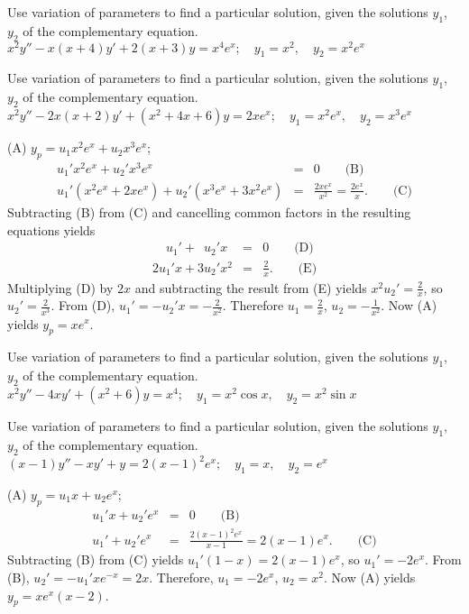 \documentclass{ximera}
\begin{document}
\begin{problem}\label{exer:5.7.25}
Use variation
of parameters to find a particular solution, given the solutions
$y_1$, $y_2$ of the complementary equation. $x^2y''-x(x+4)y'+2(x+3)y=x^4e^x;  \quad y_1=x^2, \quad y_2=x^2e^x$
\end{problem}

\begin{problem}\label{exer:5.7.26}
Use variation
of parameters to find a particular solution, given the solutions
$y_1$, $y_2$ of the complementary equation. $x^2y''-2x(x+2)y'+(x^2+4x+6)y=2xe^x;  \quad y_1=x^2e^x, \quad y_2=x^3e^x$

\begin{solution}
    (A) $y_p=u_1x^2e^x+u_2x^3e^x$;\;
\begin{eqnarray*}
u_1'x^2e^x+u_2'x^3e^x&=&0\qquad\text{(B)}\\ %
u_1'(x^2e^x+2xe^x)+u_2'(x^3e^x+3x^2e^x)&=&\frac{2xe^x}{
x^2}=\frac{2e^x}{ x}.\qquad\text{(C)} %
\end{eqnarray*}
Subtracting (B) from (C)
and cancelling common factors in the resulting equations
yields
\begin{eqnarray*}
\phantom{2x}u_1'+\phantom{3}u_2'x&=&0\qquad\text{(D)}\\ %
2u_1'x+3u_2'x^2&=&\frac{2}{ x}.\qquad\text{(E)} %
\end{eqnarray*}
Multiplying (D) by $2x$ and subtracting the result
from (E) yields $x^2u_2'=\frac{2}{ x}$, so
$u_2'=\frac{2}{ x^3}$. From (D),
$u_1'=-u_2'x=-\frac{2}{ x^2}$. Therefore $u_1=\frac{2}{ x}$,
$u_2=-\frac{1}{ x^2}$. Now (A) yields $y_p=xe^x$.
\end{solution}
\end{problem}

\begin{problem}\label{exer:5.7.27}
Use variation
of parameters to find a particular solution, given the solutions
$y_1$, $y_2$ of the complementary equation. $x^2y''-4xy'+(x^2+6)y=x^4;  \quad y_1=x^2\cos x, \quad y_2=x^2\sin x$
\end{problem}

\begin{problem}\label{exer:5.7.28}
Use variation
of parameters to find a particular solution, given the solutions
$y_1$, $y_2$ of the complementary equation. $(x-1)y''-xy'+y=2(x-1)^2e^x;  \quad y_1=x, \quad y_2=e^x$

\begin{solution}
    (A) $y_p=u_1x+u_2e^x$;\;
\begin{eqnarray*}
u_1'x+u_2'e^x&=&0\qquad\text{(B)}\\ %
u_1'+u_2'e^x&=&\frac{2(x-1)^2e^x}{
x-1}=2(x-1)e^x.\qquad\text{(C)} %
\end{eqnarray*}
Subtracting (B) from (C)
yields $u_1'(1-x)=2(x-1)e^x$, so $u_1'=-2e^x$. From
(B), $u_2'=-u_1'xe^{-x}=2x$. Therefore,
$u_1=-2e^x$, $u_2=x^2$. Now (A) yields $y_p=xe^x(x-2)$.
\end{solution}
\end{problem}
\end{document}

